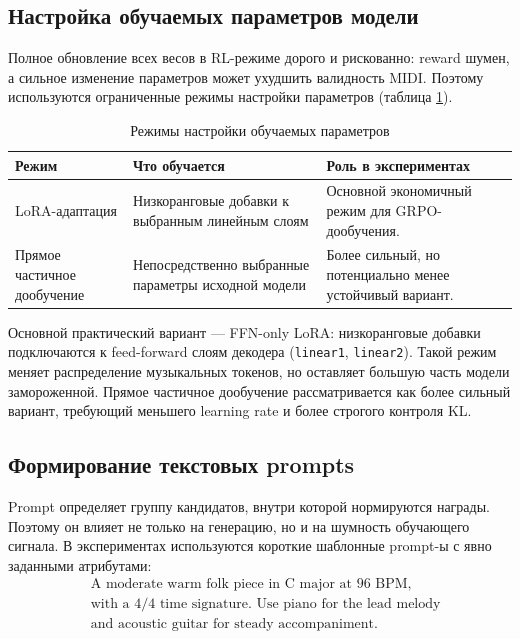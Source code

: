 \documentclass[a4paper,12pt]{extarticle}
\begin{document}
\subsection{Настройка обучаемых параметров модели}

Полное обновление всех весов в RL-режиме дорого и рискованно: reward
шумен, а сильное изменение параметров может ухудшить валидность MIDI.
Поэтому используются ограниченные режимы настройки параметров
(таблица \ref{tab:adaptation_modes}).

\begin{table}[ht]
\centering
\caption{Режимы настройки обучаемых параметров}
\label{tab:adaptation_modes}
\begin{tabular}{p{}p{}p{}}
\toprule
Режим & Что обучается & Роль в экспериментах \\
\midrule
LoRA-адаптация & Низкоранговые добавки к выбранным линейным слоям & Основной экономичный режим для GRPO-дообучения. \\
Прямое частичное дообучение & Непосредственно выбранные параметры исходной модели & Более сильный, но потенциально менее устойчивый вариант. \\
\bottomrule
\end{tabular}
\end{table}

Основной практический вариант --- FFN-only LoRA: низкоранговые добавки
подключаются к feed-forward слоям декодера (\texttt{linear1},
\texttt{linear2}). Такой режим меняет распределение музыкальных токенов,
но оставляет большую часть модели замороженной. Прямое частичное
дообучение рассматривается как более сильный вариант, требующий меньшего
learning rate и более строгого контроля KL.

\subsection{Формирование текстовых prompts}

Prompt определяет группу кандидатов, внутри которой нормируются награды.
Поэтому он влияет не только на генерацию, но и на шумность обучающего
сигнала. В экспериментах используются короткие шаблонные prompt-ы с
явно заданными атрибутами:
\[
\begin{aligned}
&\text{A moderate warm folk piece in C major at 96 BPM,}\\
&\text{with a 4/4 time signature. Use piano for the lead melody}\\
&\text{and acoustic guitar for steady accompaniment.}
\end{aligned}
\]
\end{document}
